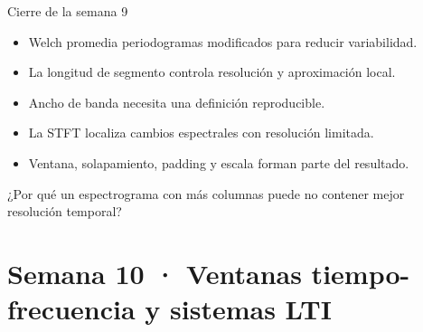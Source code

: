 \documentclass[
  ignorenonframetext,
  aspectratio=169,
  spanish,
]{beamer}
\providecommand{\tightlist}{%
  \setlength{\itemsep}{0pt}\setlength{\parskip}{0pt}}
\begin{document}
\begin{frame}{Cierre de la semana 9}
  \protect{}\label{cierre-de-la-semana-9}
  \begin{itemize}
    \tightlist
    \item
          Welch promedia periodogramas modificados para reducir variabilidad.
    \item
          La longitud de segmento controla resolución y aproximación local.
    \item
          Ancho de banda necesita una definición reproducible.
    \item
          La STFT localiza cambios espectrales con resolución limitada.
    \item
          Ventana, solapamiento, padding y escala forman parte del resultado.
  \end{itemize}

  \begin{tcolorbox}[enhanced jigsaw, arc=.35mm, bottomrule=.15mm, bottomtitle=1mm, breakable, colback=white, colbacktitle=quarto-callout-note-color!10!white, colframe=quarto-callout-note-color-frame, coltitle=black, left=2mm, leftrule=.75mm, opacityback=0, opacitybacktitle=0.6, rightrule=.15mm, title=\textcolor{quarto-callout-note-color}{\faInfo}\hspace{0.5em}{Pregunta de salida}, titlerule=0mm, toprule=.15mm, toptitle=1mm]

    ¿Por qué un espectrograma con más columnas puede no contener mejor
    resolución temporal?

  \end{tcolorbox}
\end{frame}

\section{Semana 10 · Ventanas tiempo-frecuencia y sistemas
  LTI}\label{semana-10-ventanas-tiempo-frecuencia-y-sistemas-lti}
\end{document}
